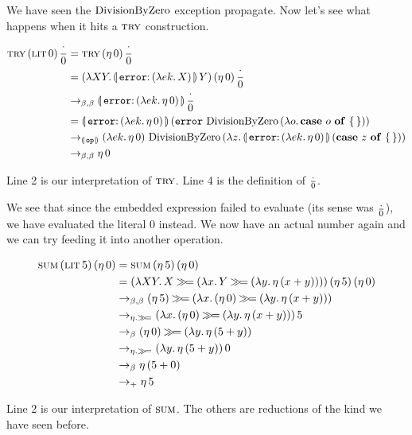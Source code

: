 We have seen the $\operatorname{DivisionByZero}$ exception propagate. Now let's see what
happens when it hits a $\textsc{try}$ construction.

\begin{align}
  \app{\trye}{\litec{0}}{\dbze}
  &= \app{\trye}{(\ap{\eta}{0})}{\dbze} \\
  &= \app{(\lam{X Y}{\ap{\banana{\onto{\op{error}}{(\lam{e k}{X})}}}{Y}})}{(\ap{\eta}{0})}{\dbze} \\
  &\to_{\beta,\beta} \ap{\banana{\onto{\op{error}}{(\lam{e k}{\ap{\eta}{0}})}}}{\dbze} \\
  &= \ap{\banana{\onto{\op{error}}{(\lam{e k}{\ap{\eta}{0}})}}}{(\app{\op{error}}{\dbzelong}{(\lam{o}{\absurd{o}})})} \\
  &\to_{\banana{\op{op}}} \app{(\lam{e k}{\ap{\eta}{0}})}{\dbzelong}{(\lam{z}{\ap{\banana{\onto{\op{error}}{(\lam{e k}{\ap{\eta}{0}})}}}{(\absurd{z})}})} \\
  &\to_{\beta,\beta} \ap{\eta}{0}
\end{align}
\setcounter{equation}{0}

Line 2 is our interpretation of $\textsc{try}$. Line 4 is the definition of
$\frac{\cdot}{0}$.

We see that since the embedded expression failed to evaluate (its sense was
$\frac{\cdot}{0}$), we have evaluated the literal 0 instead. We now have an actual
number again and we can try feeding it into another operation.

\begin{align}
  \app{\sume}{\litec{5}}{(\ap{\eta}{0})}
  &= \app{\sume}{(\ap{\eta}{5})}{(\ap{\eta}{0})} \\
  &= \app{(\lam{X Y}{X \hsbind (\lam{x}{Y \hsbind (\lam{y}{\ap{\eta}{(x + y)}})})})}{(\ap{\eta}{5})}{(\ap{\eta}{0})} \\
  &\to_{\beta,\beta} (\ap{\eta}{5}) \hsbind (\lam{x}{(\ap{\eta}{0}) \hsbind (\lam{y}{\ap{\eta}{(x + y)}})}) \\
  &\to_{\eta.\hsbind} \ap{(\lam{x}{(\ap{\eta}{0}) \hsbind (\lam{y}{\ap{\eta}{(x + y)}})})}{5} \\
  &\to_{\beta} (\ap{\eta}{0}) \hsbind (\lam{y}{\ap{\eta}{(5 + y)}}) \\
  &\to_{\eta.\hsbind} \ap{(\lam{y}{\ap{\eta}{(5 + y)}})}{0} \\
  &\to_{\beta} \ap{\eta}{(5 + 0)} \\
  &\to_+ \ap{\eta}{5}
\end{align}
\setcounter{equation}{0}

Line 2 is our interpretation of $\textsc{sum}$. The others are reductions of the
kind we have seen before.

